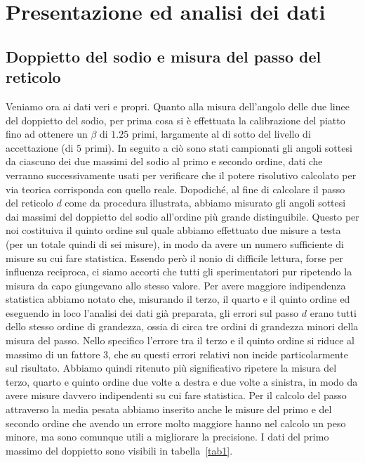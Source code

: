 \documentclass[a4paper,10pt]{article}
\begin{document}
	
	\section{Presentazione ed analisi dei dati}
	\subsection{Doppietto del sodio e misura del passo del reticolo}
	Veniamo ora ai dati veri e propri. Quanto alla misura dell'angolo delle due linee del doppietto del sodio, per prima cosa si è effettuata la calibrazione del piatto fino ad ottenere un $\beta$ di $1.25$ primi, largamente al di sotto del livello di accettazione (di $ 5 $ primi). In seguito a ciò sono stati campionati gli angoli sottesi da ciascuno dei due massimi del sodio al primo e secondo ordine, dati che verranno successivamente usati per verificare che il potere risolutivo calcolato per via teorica corrisponda con quello reale. Dopodiché, al fine di calcolare il passo del reticolo $d$ come da procedura illustrata, abbiamo misurato gli angoli sottesi dai massimi del doppietto del sodio all'ordine più grande distinguibile. Questo per noi costituiva il quinto ordine sul quale abbiamo effettuato due misure a testa (per un totale quindi di sei misure), in modo da avere un numero sufficiente di misure su cui fare statistica. Essendo però il nonio di difficile lettura, forse per influenza reciproca, ci siamo accorti che tutti gli sperimentatori pur ripetendo la misura da capo giungevano allo stesso valore. Per avere maggiore indipendenza statistica abbiamo notato che, misurando il terzo, il quarto e il quinto ordine ed eseguendo in loco l'analisi dei dati già preparata, gli errori sul passo $d$ erano tutti dello stesso ordine di grandezza, ossia di circa tre ordini di grandezza minori della misura del passo. Nello specifico l'errore tra il terzo e il quinto ordine si riduce al massimo di un fattore $3$, che su questi errori relativi non incide particolarmente sul risultato. Abbiamo quindi ritenuto più significativo ripetere la misura del terzo, quarto e quinto ordine due volte a destra e due volte a sinistra, in modo da avere misure davvero indipendenti su cui fare statistica. Per il calcolo del passo attraverso la media pesata abbiamo inserito anche le misure del primo e del secondo ordine che avendo un errore molto maggiore hanno nel calcolo un peso minore, ma sono comunque utili a migliorare la precisione. I dati del primo massimo del doppietto sono visibili in tabella~\ref{tab1}.
	
\end{document}
